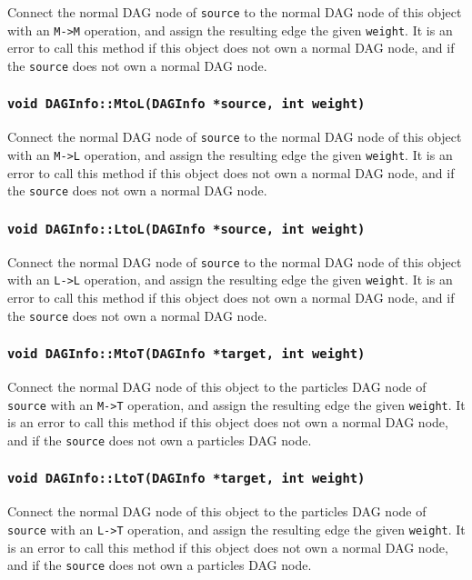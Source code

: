 Connect the normal DAG node of \texttt{source} to the normal DAG node of
this object with an \texttt{M->M} operation, and assign the resulting edge the
given \texttt{weight}. It is an error to call this method if this object does
not own a normal DAG node, and if the \texttt{source} does not own a normal
DAG node.

\subsubsection{\texttt{void DAGInfo::MtoL(DAGInfo *source, int weight)}}

Connect the normal DAG node of \texttt{source} to the normal DAG node of
this object with an \texttt{M->L} operation, and assign the resulting edge the
given \texttt{weight}. It is an error to call this method if this object does
not own a normal DAG node, and if the \texttt{source} does not own a normal
DAG node.

\subsubsection{\texttt{void DAGInfo::LtoL(DAGInfo *source, int weight)}}

Connect the normal DAG node of \texttt{source} to the normal DAG node of
this object with an \texttt{L->L} operation, and assign the resulting edge the
given \texttt{weight}. It is an error to call this method if this object does
not own a normal DAG node, and if the \texttt{source} does not own a normal
DAG node.

\subsubsection{\texttt{void DAGInfo::MtoT(DAGInfo *target, int weight)}}

Connect the normal DAG node of this object to the particles DAG node of
\texttt{source} with an \texttt{M->T} operation, and assign the resulting edge
the given \texttt{weight}. It is an error to call this method if this object
does not own a normal DAG node, and if the \texttt{source} does not own a
particles DAG node.

\subsubsection{\texttt{void DAGInfo::LtoT(DAGInfo *target, int weight)}}

Connect the normal DAG node of this object to the particles DAG node of
\texttt{source} with an \texttt{L->T} operation, and assign the resulting edge
the given \texttt{weight}. It is an error to call this method if this object
does not own a normal DAG node, and if the \texttt{source} does not own a
particles DAG node.

